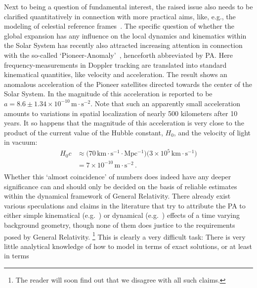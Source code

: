 \documentclass
[rmp,aps,twocolumn,showpacs,preprintnumbers,amsmath,amssymb]{revtex4}
\theoremstyle{plain}
\theoremstyle{definition}
\theoremstyle{remark}
\begin{document}
Next to being a question of fundamental interest, the raised issue also needs 
to be clarified quantitatively in connection with more practical aims, like, 
e.g., the modeling of celestial reference frames~\cite{Klioner.Soffel:2005}. 
The specific question of whether the global expansion has any influence on 
the local dynamics and kinematics within the Solar System has recently also 
attracted increasing attention in connection with the so-called 
`Pioneer-Anomaly'~\cite{Anderson.etal:1998,Anderson.etal:2002a,%
Markwardt:2002,Nieto.Turyshev:2004,Turyshev.etal:2005a,Turyshev.etal:2005b}, 
henceforth abbreviated by PA. Here frequency-measurements in Doppler tracking 
are translated into standard kinematical quantities, like velocity and 
acceleration. The result shows an anomalous acceleration of the Pioneer 
satellites directed towards the center of the Solar System. 
In \cite{Markwardt:2002} the magnitude of this acceleration is reported to 
be $a=8.6\pm 1.34\times 10^{-10}\,\mathrm{m\cdot s^{-2}}$. Note that such 
an apparently small acceleration amounts to variations in spatial 
localization of nearly 500 kilometers after 10 years. It so happens that the 
magnitude of this acceleration is very close to the product of the current 
value of the Hubble constant, $H_0$, and the velocity of light in vacuum: 
%
\begin{equation}\label{eq:HubbleTimesC}
\begin{split}
  H_0c&\approx 
  \bigl(70\,\mathrm{km\cdot s^{-1}\cdot Mpc^{-1}}\bigr)
  \bigl(3\times 10^5\,\mathrm{km\cdot s^{-1}}\bigr)\\
  &=7\times 10^{-10}\,\mathrm{m\cdot s^{-2}}\,.\\
\end{split}
\end{equation}
%
Whether this `almost coincidence' of numbers does indeed have any deeper 
significance can and should only be decided on the basis of reliable 
estimates within the dynamical framework of General Relativity. There already 
exist various speculations and claims in the literature that try to attribute 
the PA to either simple kinematical (e.g.~\cite{Rosales.Sanchez-Gomez:1998}) 
or dynamical (e.g.~\cite{Fahr.Siewert:2008}) effects of a time varying 
background geometry, though none of them does justice to the requirements 
posed by General Relativity.%
\footnote{The reader will soon find out that we disagree with all such 
claims.} 
This is clearly a very difficult task: There is very little analytical 
knowledge of how to model in terms of exact solutions, or at least in terms 
\end{document}

